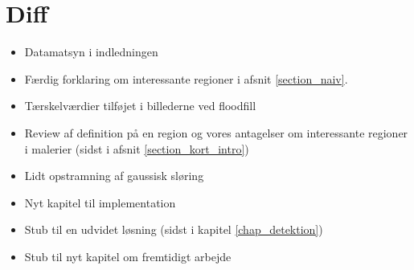 {
\section*{Diff}
\begin{itemize}
    \item Datamatsyn i indledningen
    \item Færdig forklaring om interessante regioner i afsnit
        \ref{section_naiv}.
    \item Tærskelværdier tilføjet i billederne ved floodfill
    \item Review af definition på en region og vores antagelser om
        interessante regioner i malerier (sidst i afsnit
        \ref{section_kort_intro})
    \item Lidt opstramning af gaussisk sløring
    \item Nyt kapitel til implementation
    \item Stub til en udvidet løsning (sidst i kapitel
        \ref{chap_detektion})
    \item Stub til nyt kapitel om fremtidigt arbejde
\end{itemize}
}

